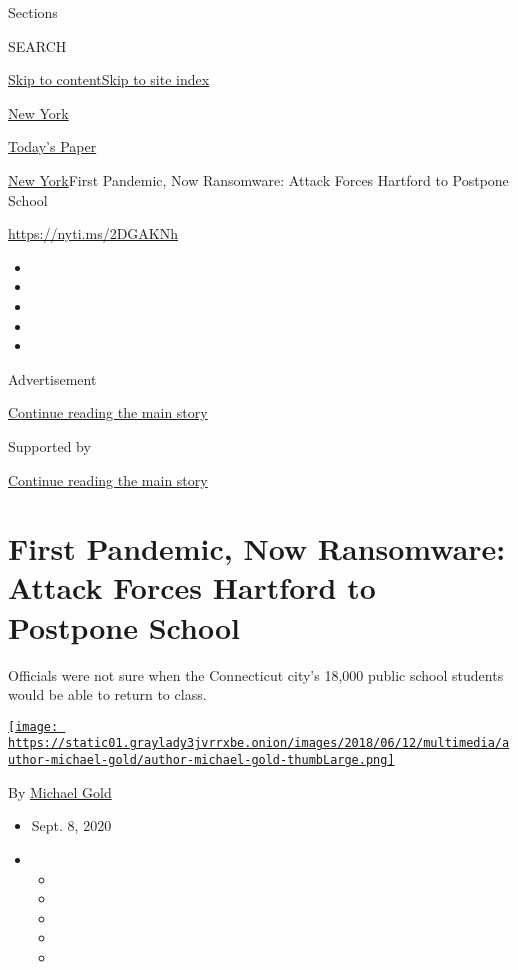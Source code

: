 Sections

SEARCH

\protect\hyperlink{site-content}{Skip to
content}\protect\hyperlink{site-index}{Skip to site index}

\href{https://www.nytimes3xbfgragh.onion/section/nyregion}{New York}

\href{https://myaccount.nytimes3xbfgragh.onion/auth/login?response_type=cookie\&client_id=vi}{}

\href{https://www.nytimes3xbfgragh.onion/section/todayspaper}{Today's
Paper}

\href{/section/nyregion}{New York}\textbar{}First Pandemic, Now
Ransomware: Attack Forces Hartford to Postpone School

\url{https://nyti.ms/2DGAKNh}

\begin{itemize}
\item
\item
\item
\item
\item
\end{itemize}

Advertisement

\protect\hyperlink{after-top}{Continue reading the main story}

Supported by

\protect\hyperlink{after-sponsor}{Continue reading the main story}

\hypertarget{first-pandemic-now-ransomware-attack-forces-hartford-to-postpone-school}{%
\section{First Pandemic, Now Ransomware: Attack Forces Hartford to
Postpone
School}\label{first-pandemic-now-ransomware-attack-forces-hartford-to-postpone-school}}

Officials were not sure when the Connecticut city's 18,000 public school
students would be able to return to class.

\href{https://www.nytimes3xbfgragh.onion/by/michael-gold}{\texttt{[image: https://static01.graylady3jvrrxbe.onion/images/2018/06/12/multimedia/author-michael-gold/author-michael-gold-thumbLarge.png]}}

By \href{https://www.nytimes3xbfgragh.onion/by/michael-gold}{Michael
Gold}

\begin{itemize}
\item
  Sept. 8, 2020
\item
  \begin{itemize}
  \item
  \item
  \item
  \item
  \item
  \end{itemize}
\end{itemize}

